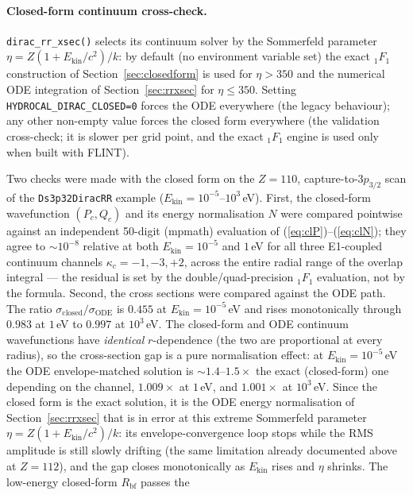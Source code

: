 \documentclass[11pt,a4paper]{article}
\begin{document}
\paragraph{Closed-form continuum cross-check.}
{\tt dirac\_rr\_xsec()} selects its continuum solver by the Sommerfeld
parameter $\eta=Z(1+E_{\mathrm{kin}}/c^{2})/k$: by default (no environment
variable set) the exact ${}_{1}F_{1}$ construction of
Section~\ref{sec:closedform} is used for $\eta>350$ and the numerical ODE
integration of Section~\ref{sec:rrxsec} for $\eta\le350$.  Setting {\tt
HYDROCAL\_DIRAC\_CLOSED=0} forces the ODE everywhere (the legacy
behaviour); any other non-empty value forces the closed form everywhere
(the validation cross-check; it is slower per grid point, and the exact
${}_{1}F_{1}$ engine is used only when built with FLINT).

Two checks were made with the closed form on the $Z=110$,
capture-to-$3p_{3/2}$ scan of the {\tt Ds3p32DiracRR} example
($E_{\mathrm{kin}}=10^{-5}$--$10^{3}$\,eV).  First, the closed-form
wavefunction $(P_c,Q_c)$ and its energy normalisation $N$ were compared
pointwise against an independent 50-digit (mpmath) evaluation of
(\ref{eq:clP})--(\ref{eq:clN}); they agree to $\sim10^{-8}$ relative at
both $E_{\mathrm{kin}}=10^{-5}$ and $1$\,eV for all three E1-coupled
continuum channels $\kappa_c=-1,-3,+2$, across the entire radial range of
the overlap integral --- the residual is set by the double/quad-precision
${}_1F_1$ evaluation, not by the formula.  Second, the cross sections were
compared against the ODE path.  The ratio
$\sigma_{\mathrm{closed}}/\sigma_{\mathrm{ODE}}$ is $0.455$ at
$E_{\mathrm{kin}}=10^{-5}$\,eV and rises monotonically through $0.983$ at
$1$\,eV to $0.997$ at $10^{3}$\,eV.  The closed-form and ODE continuum
wavefunctions have \emph{identical} $r$-dependence (the two are
proportional at every radius), so the cross-section gap is a pure
normalisation effect: at $E_{\mathrm{kin}}=10^{-5}$\,eV the ODE
envelope-matched solution is $\sim1.4$--$1.5\times$ the exact (closed-form)
one depending on the channel, $1.009\times$ at $1$\,eV, and $1.001\times$ at
$10^{3}$\,eV.  Since the closed form is the exact solution, it is the ODE
energy normalisation of Section~\ref{sec:rrxsec} that is in error at this
extreme Sommerfeld parameter $\eta=Z(1+E_{\mathrm{kin}}/c^{2})/k$: its
envelope-convergence loop stops while the RMS amplitude is still slowly
drifting (the same limitation already documented above at $Z=112$), and
the gap closes monotonically as $E_{\mathrm{kin}}$ rises and $\eta$
shrinks.  The low-energy closed-form $R_{\mathrm{bf}}$ passes the
\end{document}
